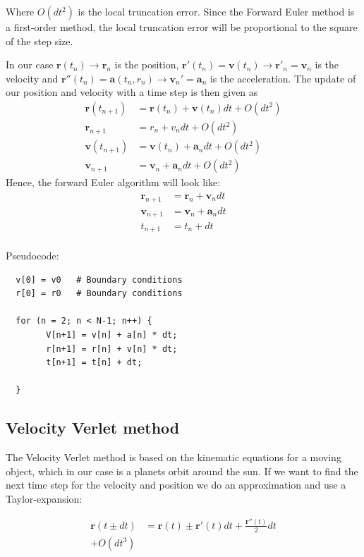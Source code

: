 \documentclass{article}
\begin{document}
Where $O(dt^2)$ is the local truncation error. Since the Forward Euler method is a first-order method, the local truncation error will be proportional to the square of the step size.

In our case $\mathbf{r}(t_n) \rightarrow \mathbf{r}_n$ is the position, $\mathbf{r}'(t_n)=\mathbf{v}(t_n) \rightarrow \mathbf{r}'_n=\mathbf{v}_n$ is the velocity and $\mathbf{r}''(t_n)=\mathbf{a}(t_n,r_n) \rightarrow \mathbf{v}_n'=\mathbf{a}_n$ is the acceleration. The update of our position and velocity with a  time step is then given as  
\begin{align*}
    \mathbf{r}(t_{n+1})&=\mathbf{r}(t_n) + \mathbf{v}(t_n)dt + O(dt^2)\\
    \mathbf{r}_{n+1}&=r_{n} + v_{n}dt + O(dt^2)\\
    \mathbf{v}(t_{n+1})&=\mathbf{v}(t_n)+\mathbf{a}_ndt + O(dt^2)\\
    \mathbf{v}_{n+1}&=\mathbf{v}_n +\mathbf{a}_n dt + O(dt^2)
\end{align*}
Hence, the forward Euler algorithm will look like:
\begin{align*}
    \mathbf{r}_{n+1}&=\mathbf{r}_n+\mathbf{v}_ndt\\
    \mathbf{v}_{n+1}&=\mathbf{v}_n+\mathbf{a}_ndt\\
    t_{n+1}&=t_n + dt
\end{align*}
\\
Pseudocode:

\begin{verbatim}
  v[0] = v0   # Boundary conditions
  r[0] = r0   # Boundary conditions

  for (n = 2; n < N-1; n++) {
        V[n+1] = v[n] + a[n] * dt;
        r[n+1] = r[n] + v[n] * dt;
        t[n+1] = t[n] + dt;
       
  }
\end{verbatim}

\subsection{Velocity Verlet method}
The Velocity Verlet method is based on the kinematic equations for a moving object, which in our case is a planets orbit around the sun. If we want to find the next time step for the velocity and position we do an approximation and use a Taylor-expansion:    

\begin{align*}
\mathbf{r}(t\pm dt)&=\mathbf{r}(t)\pm \mathbf{r}'(t)dt + \frac{\mathbf{r}''(t)}{2}dt\\ + O(dt^3)
\end{align*}
\end{document}
